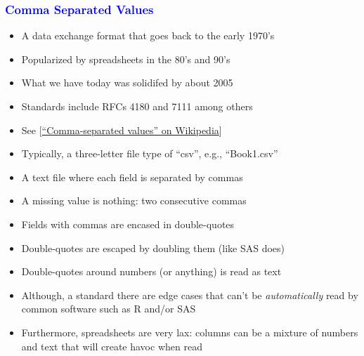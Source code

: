 \documentclass[11pt,pdftex,dvipsnames,usenames]{beamer}
\begin{document}
\begin{frame}[fragile]\frametitle{\bf\textcolor{blue}{Comma Separated Values}}

\begin{itemize}
\item A data exchange format that goes back to the early 1970's
\item Popularized by spreadsheets in the 80's and 90's
\item What we have today was solidifed by about 2005 
\item Standards include RFCs 4180 and 7111 among others
\item See \textcolor{PineGreen}{[\href{https://en.wikipedia.org/wiki/Comma-separated_values}
{``Comma-separated values'' on Wikipedia}]}
\item Typically, a three-letter file type of ``csv'',
e.g., ``Book1.csv''
\item A text file where each field is separated by commas
\item A missing value is nothing: two consecutive commas
\item Fields with commas are encased in double-quotes
\item Double-quotes are escaped by doubling them (like SAS does)
\item Double-quotes around numbers (or anything) is read as text 
\item Although, a standard there are edge cases that can't be
  {\it automatically} read by common software such as R and/or SAS
\item Furthermore, spreadsheets are very lax: columns can be a mixture of numbers and text that will create havoc when read
\end{itemize}

\end{frame}
\end{document}
